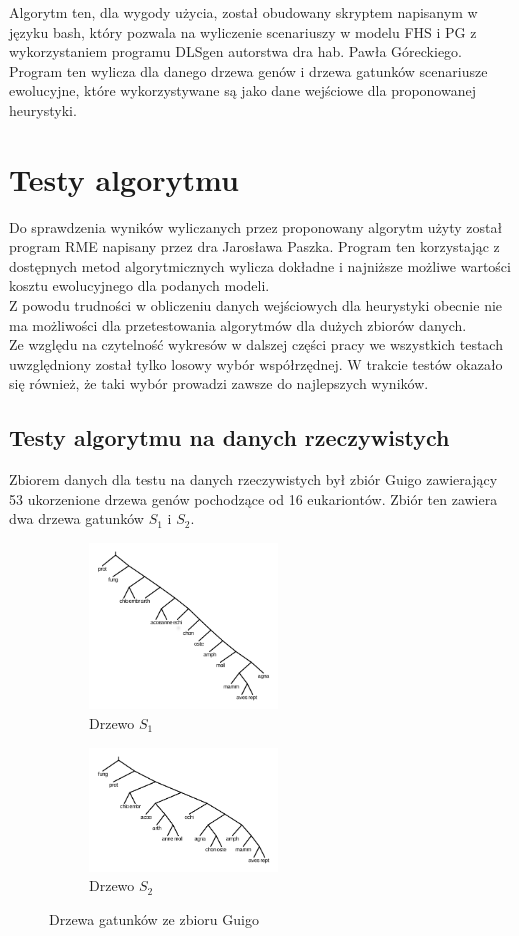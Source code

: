 \documentclass[licencjacka]{pracamgr}
\begin{document}
Algorytm ten, dla wygody użycia, został obudowany skryptem napisanym w języku bash, który pozwala na wyliczenie scenariuszy w modelu FHS i PG z wykorzystaniem programu DLSgen autorstwa dra hab. Pawła Góreckiego.\cite{dlsgen} Program ten wylicza dla danego drzewa genów i drzewa gatunków scenariusze ewolucyjne, które wykorzystywane są jako dane wejściowe dla proponowanej heurystyki.


\section{Testy algorytmu}
Do sprawdzenia wyników wyliczanych przez proponowany algorytm użyty został program RME napisany przez dra Jarosława Paszka. Program ten korzystając z dostępnych metod algorytmicznych wylicza dokładne i najniższe możliwe wartości kosztu ewolucyjnego dla podanych modeli. \cite{rme}
\\
Z powodu trudności w obliczeniu danych wejściowych dla heurystyki obecnie nie ma możliwości dla przetestowania algorytmów dla dużych zbiorów danych.
\\
Ze względu na czytelność wykresów w dalszej części pracy we wszystkich testach uwzględniony został tylko losowy wybór współrzędnej. W trakcie testów okazało się również, że taki wybór prowadzi zawsze do najlepszych wyników. 


\subsection{Testy algorytmu na danych rzeczywistych}
Zbiorem danych dla testu na danych rzeczywistych był zbiór Guigo zawierający 53 ukorzenione drzewa genów pochodzące od 16 eukariontów. Zbiór ten zawiera dwa drzewa gatunków $S_1$ i $S_2$. \cite{guigo}

\begin{figure}[H]
\centering
\begin{subfigure}{.5\textwidth}
  \centering
  \includegraphics[width=50mm]{./pictures/guigo_spec_1.png}
  \caption{Drzewo $S_1$}
  \label{fig:sub2}
\end{subfigure}%
\begin{subfigure}{.5\textwidth}
  \centering
  \includegraphics[width=50mm]{./pictures/guigo_spec_2.png}
  \caption{Drzewo $S_2$}
  \label{fig:sub1}
\end{subfigure}%
\caption{Drzewa gatunków ze zbioru Guigo}
\label{fig:test}
\end{figure}
\end{document}
